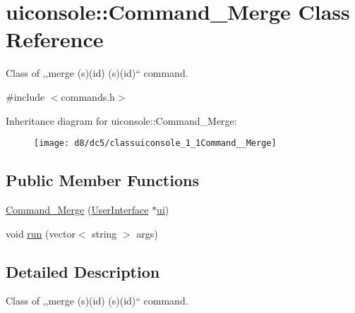\hypertarget{classuiconsole_1_1Command__Merge}{
\section{uiconsole::Command\_\-Merge Class Reference}
\label{d8/dc5/classuiconsole_1_1Command__Merge}
}


Class of ,,merge (s)(id) (s)(id)`` command.  




{\ttfamily \#include $<$commands.h$>$}

Inheritance diagram for uiconsole::Command\_\-Merge:\begin{figure}[H]
\begin{center}
\leavevmode
\texttt{[image: d8/dc5/classuiconsole\_1\_1Command\_\_Merge]}
\end{center}
\end{figure}
\subsection*{Public Member Functions}
\begin{DoxyCompactItemize}
\item 
\hyperlink{classuiconsole_1_1Command__Merge_a7d15ac15581529bd9137d7242c798d34}{Command\_\-Merge} (\hyperlink{classUserInterface}{UserInterface} $\ast$\hyperlink{classuiconsole_1_1Command_ab43ed5152860c099f858d62f9f556699}{ui})
\item 
void \hyperlink{classuiconsole_1_1Command__Merge_a5d82c5fab7e1f57b885a00eab2cb87b0}{run} (vector$<$ string $>$ args)
\end{DoxyCompactItemize}


\subsection{Detailed Description}
Class of ,,merge (s)(id) (s)(id)`` command. 

